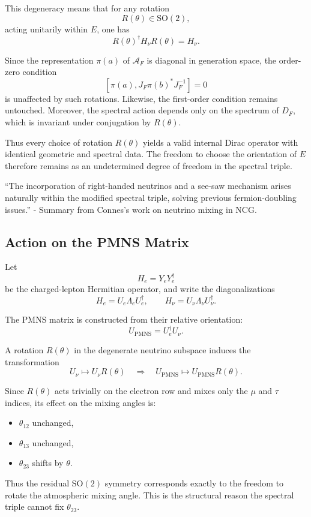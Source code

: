 This degeneracy means that for any rotation
\[
R(\theta) \in \mathrm{SO}(2),
\]
acting unitarily within $E$, one has
\[
R(\theta)^\dagger H_\nu R(\theta) = H_\nu.
\]

Since the representation $\pi(a)$ of $\mathcal A_F$ is diagonal in generation space, the order-zero condition
\[
[\pi(a),J_F\pi(b)^*J_F^{-1}] = 0
\]
is unaffected by such rotations. Likewise, the first-order condition remains untouched. Moreover, the spectral action depends only on the spectrum of $D_F$, which is invariant under conjugation by $R(\theta)$.

Thus every choice of rotation $R(\theta)$ yields a valid internal Dirac operator with identical geometric and spectral data. The freedom to choose the orientation of $E$ therefore remains as an undetermined degree of freedom in the spectral triple.

``The incorporation of right-handed neutrinos and a see-saw mechanism arises naturally within the modified spectral triple, solving previous fermion-doubling issues.'' - Summary from Connes's work on neutrino mixing in NCG.

\subsection{Action on the PMNS Matrix}

Let
\[
H_e = Y_e Y_e^\dagger
\]
be the charged-lepton Hermitian operator, and write the diagonalizations
\[
H_e = U_e \Lambda_e U_e^\dagger,\qquad
H_\nu = U_\nu \Lambda_\nu U_\nu^\dagger.
\]

The PMNS matrix is constructed from their relative orientation:
\[
U_{\mathrm{PMNS}} = U_e^\dagger U_\nu.
\]

A rotation $R(\theta)$ in the degenerate neutrino subspace induces the transformation
\[
U_\nu \longmapsto U_\nu R(\theta)
\quad\Longrightarrow\quad
U_{\mathrm{PMNS}} \longmapsto U_{\mathrm{PMNS}} R(\theta).
\]

Since $R(\theta)$ acts trivially on the electron row and mixes only the $\mu$ and $\tau$ indices, its effect on the mixing angles is:
\begin{itemize}
\item $\theta_{12}$ unchanged,
\item $\theta_{13}$ unchanged,
\item $\theta_{23}$ shifts by $\theta$.
\end{itemize}

Thus the residual $\mathrm{SO}(2)$ symmetry corresponds exactly to the freedom to rotate the atmospheric mixing angle. This is the structural reason the spectral triple cannot fix $\theta_{23}$.

